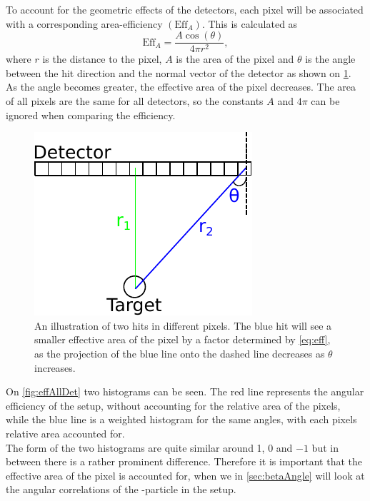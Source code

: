 To account for the geometric effects of the detectors, each pixel will be associated with a corresponding area-efficiency $(\text{Eff}_A)$.
This is calculated as 
\begin{equation}
\text{Eff}_A = \dfrac{A\cos(\theta) }{ 4 \pi r^2},
\label{eq:eff}
\end{equation}
where $r$ is the distance to the pixel, $A$ is the area of the pixel and $\theta$ is the angle between the hit direction and the normal vector of the detector as shown on \cref{fig:EffGeometry}. As the angle becomes greater, the effective area of the pixel decreases. 
The area of all pixels are the same for all detectors, so the constants $A$ and $4\pi$ can be ignored when comparing the efficiency. 


\begin{figure}[h]
	\centering
	\includegraphics[width=.7\linewidth]{../figures/detektorEffDrawingv2.pdf}
	\caption{An illustration of two hits in different pixels. The blue hit will see a smaller effective area of the pixel by a factor determined by \cref{eq:eff}, as the projection of the blue line onto the dashed line decreases as $\theta$ increases.}
	\label{fig:EffGeometry}
\end{figure}

On \cref{fig:effAllDet} two histograms can be seen. The red line represents the angular efficiency of the setup, without accounting for the relative area of the pixels, while the blue line is a weighted histogram for the same angles, with each pixels relative area accounted for. \\
The form of the two histograms are quite similar around 1, 0 and $-1$ but in between there is a rather prominent difference. Therefore it is important that the effective area of the pixel is accounted for, when we in \cref{sec:betaAngle} will look at the angular correlations of the \be-particle in the setup. 



